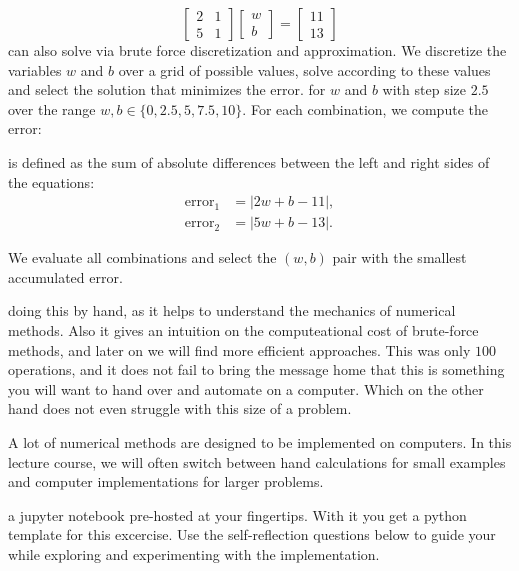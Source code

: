 \begin{equation}
    \begin{bmatrix}2 & 1 \\ 5 & 1\end{bmatrix} \begin{bmatrix}w \\ b\end{bmatrix} = \begin{bmatrix}11 \\ 13\end{bmatrix}
\end{equation}
 can also solve via brute force discretization and approximation.
We discretize the variables $w$ and $b$ over a grid of possible values, solve according to these values and select 
the solution that minimizes the error.
 for $w$ and $b$ with step size $2.5$ over the range $w, b \in \{0, 2.5, 5, 7.5, 10\}$. For each combination, we compute the error:

 is defined as the sum of absolute differences between the left and right sides of the equations:
\begin{equation}
    \begin{aligned}
        \text{error}_1 &= \left|2w + b - 11\right|, \\
        \text{error}_2 &= \left|5w + b - 13\right|.
    \end{aligned}
\end{equation}




We evaluate all combinations and select the $(w, b)$ pair with the smallest accumulated error.


 doing this by hand, as it helps to understand the mechanics of numerical methods. Also it gives an intuition 
on the computeational cost of brute-force methods, and later on we will find more efficient approaches. This was only $100$ operations, and it does not fail to bring the message home that
this is something you will want to hand over and automate on a computer. Which on the other hand does not even struggle with this size of a problem.


 A lot of numerical methods are designed to be implemented on computers. 
In this lecture course, we will often switch between hand calculations for small examples and computer implementations for larger problems.

 a jupyter notebook pre-hosted at your fingertips. With it you get a python template for this excercise. Use the self-reflection questions below to guide your while exploring and experimenting with the implementation. 



